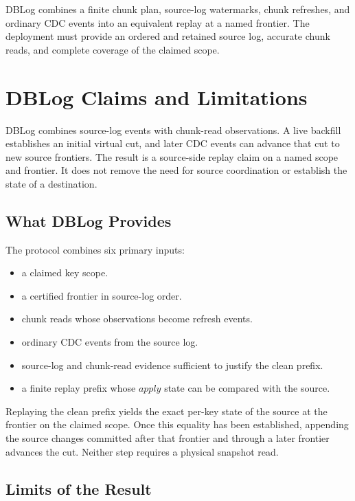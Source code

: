 \documentclass[letterpaper,10pt,twocolumn]{article}
\newcommand{\Apply}{\mathit{apply}}
\providecommand{\tightlist}{\setlength{\itemsep}{0pt}\setlength{\parskip}{0pt}}
\begin{document}
DBLog combines a finite chunk plan, source-log watermarks,
chunk refreshes, and ordinary CDC events into an equivalent replay at a
named frontier. The deployment must provide an ordered and retained
source log, accurate chunk reads, and complete coverage of the claimed
scope.

\section{DBLog Claims and
Limitations}\label{what-dblog-is-what-it-is-not-and-its-limitations}

DBLog combines source-log events with chunk-read observations. A live
backfill establishes an initial virtual cut, and later CDC events can
advance that cut to new source frontiers. The result is a source-side
replay claim on a named scope and frontier. It does not remove the need
for source coordination or establish the state of a destination.

\subsection{What DBLog Provides}\label{what-dblog-is}

The protocol combines six primary inputs:

\begin{itemize}\tightlist
\item a claimed key scope.
\item a certified frontier in source-log order.
\item chunk reads whose observations become refresh events.
\item ordinary CDC events from the source log.
\item source-log and chunk-read evidence sufficient to justify the
  clean prefix.
\item a finite replay prefix whose $\Apply$ state can be compared with
  the source.
\end{itemize}

Replaying the clean prefix yields the exact per-key state of the source
at the frontier on the claimed scope. Once this equality has been
established, appending the source changes committed after that frontier
and through a later frontier advances the cut. Neither step requires a
physical snapshot read.

\subsection{Limits of the Result}\label{what-dblog-is-not}
\end{document}
